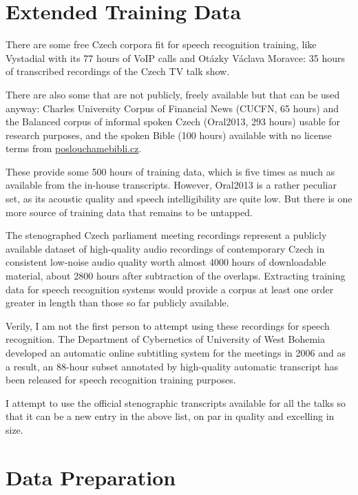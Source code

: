 \documentclass[hidelinks,12pt,a4paper]{report}
\begin{document}
\section{Extended Training Data}
\label{sec:svolocz:svolocz}

There are some free Czech corpora fit for speech recognition training, like
Vystadial\cite{vystadialarticle} with its 77 hours of VoIP calls
and Otázky Václava Moravce: 35 hours of transcribed recordings of the
Czech TV talk show\cite{ovmdata}.

There are also some that are not publicly, freely available but that can be used
anyway: Charles University
Corpus of Financial News (CUCFN, 65 hours)\cite{byrne1999large} and the Balanced
corpus of informal spoken Czech (Oral2013, 293 hours)\cite{oral2013} usable for
research purposes, and the spoken Bible (100 hours) available with no license
terms from \url{poslouchamebibli.cz}.

These provide some 500 hours of training data, which is five times as much as
available from the in-house transcripts. However, Oral2013 is a rather peculiar
set, as its acoustic quality and speech intelligibility are quite low. But there
is one more source of training data that remains to be untapped.

The stenographed Czech parliament meeting recordings represent a publicly available dataset
of high-quality audio recordings of contemporary Czech in consistent low-noise
audio quality worth almost 4000 hours of downloadable material, about 2800 hours
after subtraction of the overlaps. Extracting
training data for speech recognition systems would provide a corpus at least
one order greater in length than those so far publicly available.

Verily, I am not the first person to attempt using these recordings for speech
recognition. The Department of Cybernetics of University of West Bohemia
developed an automatic online subtitling system for the meetings in
2006\cite{pspsubs} and as a result, an 88-hour subset annotated by high-quality
automatic transcript has been released for speech recognition training
purposes\cite{pspdata}.

I attempt to use the official stenographic transcripts available for all the
talks so that it can be a new entry in the above list, on par in quality and
excelling in size.

\section{Data Preparation}
\end{document}
